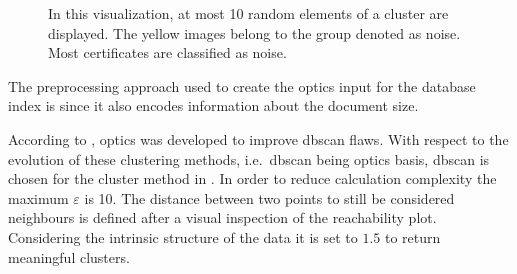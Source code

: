 \begin{figure}[!htb]
    \caption[\ac{optics} clusters]{In this visualization, at most 10 random elements of a cluster are displayed.
    The yellow images belong to the group denoted as noise.
    Most certificates are classified as noise.
    }%
    \label{fig:optics_content_cluster}%
\end{figure}


The preprocessing approach used to create the \ac{optics} input for the \databaseName{} database index is \eigendocs{} 
since it also encodes information about the document size. 

According to \citeauthor{OPTICS2014}, \ac{optics} was developed to improve \ac{dbscan} flaws.
With respect to the evolution of these clustering methods, i.e.\ \ac{dbscan} being \ac{optics} basis, 
\ac{dbscan} is chosen for the cluster method in .
In order to reduce calculation complexity the maximum $\varepsilon$ is 10.
The distance between two points to still be considered neighbours is defined after a visual inspection of the reachability plot.
Considering the intrinsic structure of the \eigendocs{} data it is set to $1.5$ to return meaningful clusters.